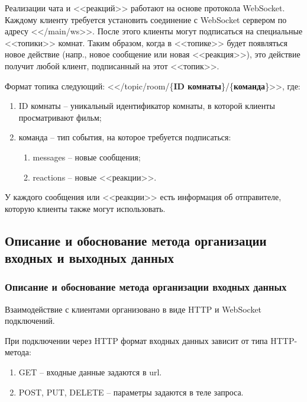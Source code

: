 \documentclass{../includes/TechDoc}
\begin{document}
    Реализации чата и <<реакций>> работают на основе протокола WebSocket.
    Каждому клиенту требуется установить соединение с WebSocket сервером по адресу <</main/ws>>.
    После этого клиенты могут подписаться на специальные <<топики>> комнат.
    Таким образом, когда в <<топике>> будет появляться новое действие (напр., новое сообщение или новая <<реакция>>), это действие получит любой клиент, подписанный на этот <<топик>>.

    Формат топика следующий: <</topic/room/\{\textbf{ID комнаты}\}/\{\textbf{команда}\}>>, где:
    \begin{enumerate}
        \item ID комнаты -- уникальный идентификатор комнаты, в которой клиенты просматривают фильм;
        \item команда -- тип события, на которое требуется подписаться:
        \begin{enumerate}
            \item messages -- новые сообщения;
            \item reactions -- новые <<реакции>>.
        \end{enumerate}
    \end{enumerate}

    У каждого сообщения или <<реакции>> есть информация об отправителе, которую клиенты также могут использовать.

    \clearpage

    \subsection{Описание и обоснование метода организации входных и выходных данных}

    \subsubsection{Описание и обоснование метода организации входных данных}

    Взаимодействие с клиентами организовано в виде HTTP и WebSocket подключений.

    При подключении через HTTP формат входных данных зависит от типа HTTP-метода:
    \begin{enumerate}
        \item GET -- входные данные задаются в url.
        \item POST, PUT, DELETE -- параметры задаются в теле запроса.
    \end{enumerate}
\end{document}
